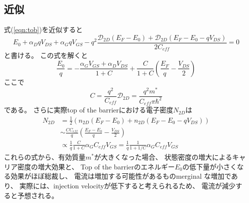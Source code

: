 \documentclass[11pt,uplatex,a4paper]{jsarticle}
\begin{document}
  \subsection{近似}
式(\ref{eqn:tob})を近似すると
\begin{equation}
 E_0 + \alpha_D q V_{DS} + \alpha_G q V_{GS} -
  q^2\frac{\mathcal{D}_{2D}(E_F - E_0)+\mathcal{D}_{2D}(E_F-E_0-qV_{DS})}{2 C_{eff}}=0
\end{equation}
と書ける。
 この式を解くと
 \begin{equation}
  \frac{E_0}{q} = -\frac{\alpha_G V_{GS} + \alpha_D V_{DS}}{1+C}
   + \frac{C}{1+C} (\frac{E_{F}}{q}-\frac{V_{DS}}{2})
 \end{equation}
 ここで
\begin{equation}
 C=\frac{q^2}{C_{eff}}\mathcal{D}_{2D} = \frac{q^2m^*}{C_{eff}\pi \hbar^2}
\end{equation}
である。
さらに実際top of the barrierにおける電子密度$N_{2D}$は
\begin{equation}
 \begin{split}
 N_{2D} &= \frac{1}{2}
  (n_{2D}(E_F-E_0) + n_{2D}(E_F-E_0-qV_{DS})) \\
  &\sim \frac{C C_{eff}}{q} (\frac{E_F - E_0}{q} - \frac{V_{DS}}{2}) \\
  &\propto \frac{1}{q}\frac{C}{1+C} \alpha_G C_{eff} V_{GS}
  = \frac{1}{q}\frac{1}{1+1/C} \alpha_G C_{eff} V_{GS}
 \end{split}
\end{equation}
これらの式から、有効質量$m^*$が大きくなった場合、
状態密度の増大によるキャリア密度の増大効果と、
Top of the barrierのエネルギー$E_0$の低下量が小さくなる効果がほぼ総裁し、
電流は増加する可能性があるものmerginal な増加であり、
実際には、injection velocityが低下すると考えられるため、
電流が減少すると予想される。

\end{document}
